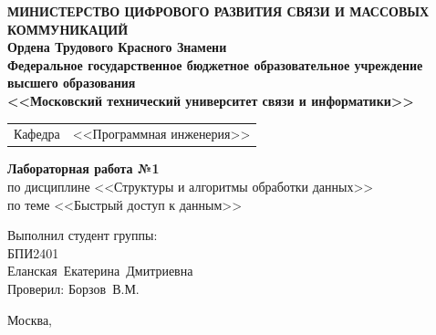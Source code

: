 \thispagestyle{empty}

\begin{center}
	\textbf{МИНИСТЕРСТВО ЦИФРОВОГО РАЗВИТИЯ СВЯЗИ И МАССОВЫХ КОММУНИКАЦИЙ} \\
	\textbf{Ордена Трудового Красного Знамени \\
		Федеральное государственное бюджетное образовательное учреждение высшего образования \\
		<<Московский технический университет связи и информатики>>}
\end{center}

\vspace{0.3em}

\begin{center}
	\begin{tabularx}{0.5\textwidth}{p{1.2cm}X}
		Кафедра & \quad <<Программная инженерия>> \\%
	\end{tabularx}
\end{center}

\vspace{12em}

\begin{center}
	\Large
	\textbf{Лабораторная работа №1} \\
	\large
	по дисциплине <<Структуры и алгоритмы обработки данных>> \\
	по теме <<Быстрый доступ к данным>>
\end{center}

\vspace{3em}

\begin{flushright}
	Выполнил студент группы: \\
	БПИ2401 \\
	Еланская~Екатерина~Дмитриевна\\
	Проверил: Борзов~В.М.\\
\end{flushright}

\vspace{8em}

\begin{center}
	Москва,~\the\year
\end{center}
\clearpage

